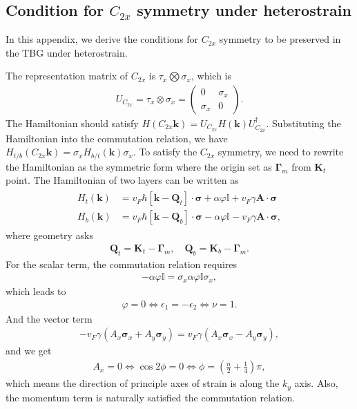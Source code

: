 \documentclass[10pt, oneside]{article}
\newcommand{\vph}{\varphi}
\newcommand{\p}[1]{\left(#1\right)}
\newcommand{\bb}[1]{\left[#1\right]}
\begin{document}
\subsection{Condition for \(C_{2x}\) symmetry under heterostrain}

In this appendix, we derive the conditions for \(C_{2x}\) symmetry to be preserved in the TBG under heterostrain.

The representation matrix of \(C_{2x}\) is \(\tau_{x} \bigotimes \sigma_{x} \), which is 
\begin{align}
	U_{C_{2x}} = \tau_{x} \otimes \sigma_{x} = \begin{pmatrix}
		0 & \sigma_{x} \\
		\sigma_{x} & 0
	\end{pmatrix}.	
\end{align}
The Hamiltonian should satisfy \(H(C_{2x} \bm{k}) = U_{C_{2x}} H(\bm{k}) U_{C_{2x}}^{\dagger}\). Substituting the Hamiltonian into the commutation relation, we have \(H_{t/b}\p{C_{2x}\bm{k}} = \sigma_{x} H_{b/t}\p{\bm{k}} \sigma_{x}\). To satisfy the \(C_{2x}\) symmetry, we need to rewrite the Hamiltonian as the symmetric form where the origin set as \(\bm{\Gamma}_{m}\) from \(\bm{K}_{t}\) point. The Hamiltonian of two layers can be written as
\begin{align}
	\begin{split}
		H_{t}\p{\bm{k}} & = v_{F} \hbar \bb{\bm{k} - \bm{Q}_{t}} \cdot \bm{\sigma} + \alpha \vph \mathbb{I} + v_{F} \gamma \bm{A} \cdot \bm{\sigma} \\
		H_{b}\p{\bm{k}} & = v_{F} \hbar \bb{\bm{k} - \bm{Q}_{b}} \cdot \bm{\sigma} - \alpha \vph \mathbb{I} - v_{F} \gamma \bm{A} \cdot \bm{\sigma},
	\end{split}
\end{align}
where geometry asks 
\begin{align}
		\bm{Q}_{t}  = \bm{K}_{t} - \bm{\Gamma}_{m}, \quad \bm{Q}_{b} = \bm{K}_{b} - \bm{\Gamma}_{m}.
\end{align}
For the scalar term, the commutation relation requires
\begin{align}
	- \alpha \vph \mathbb{I} = \sigma_{x} \alpha \vph \mathbb{I} \sigma_{x},
\end{align}
which leads to 
\begin{align}
	\vph = 0 \Leftrightarrow \epsilon_{1} = - \epsilon_{2} \Leftrightarrow \nu = 1.
\end{align}
And the vector term 
\begin{align}
	- v_{F} \gamma \p{A_{x} \bm{\sigma}_{x} + A_{y} \bm{\sigma}_{y}} = v_{F} \gamma \p{A_{x} \bm{\sigma}_{x} - A_{y} \bm{\sigma}_{y}},
\end{align}
and we get
\begin{align}
	A_{x} = 0 \Leftrightarrow \cos{2 \phi} = 0 \Leftrightarrow \phi = \p{\frac{n}{2}+ \frac{1}{4}} \pi,
\end{align}
which means the direction of principle axes of strain is along the \(k_y\) axis. Also, the momentum term is naturally satisfied the commutation relation.
\end{document}
